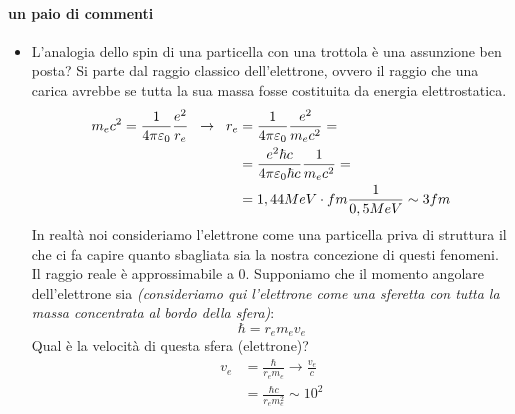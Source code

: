 \paragraph{un paio di commenti}
\begin{itemize}
\item L'analogia dello spin di una particella con una trottola è una assunzione ben posta?
Si parte dal raggio classico dell'elettrone, ovvero il raggio che una carica avrebbe se tutta la sua massa fosse costituita da energia elettrostatica.
\begin{equation}
\begin{split}
m_e c^2=\frac{1}{4\pi\varepsilon_0}\frac{e^2}{r_e}\hspace{0.2cm}\to\hspace{0.2cm}r_e & =\frac{1}{4\pi\varepsilon_0}\frac{e^2}{m_ec^2}=\\
&=\frac{e^2\hbar c}{4\pi \varepsilon_0\hbar c}\frac{1}{m_ec^2}=\\
&=1,44MeV\cdot fm\frac{1}{0,5MeV}\sim 3fm
\end{split}
\end{equation}
In realtà noi consideriamo l'elettrone come una particella priva di struttura il che ci fa capire quanto sbagliata sia la nostra concezione di questi fenomeni. 
Il raggio reale è approssimabile a $0$.
Supponiamo che il momento angolare dell'elettrone sia \emph{(consideriamo qui l'elettrone come una sferetta con tutta la massa concentrata al bordo della sfera)}:
\begin{equation}
\hbar=r_e m_e v_e
\end{equation}
Qual è la velocità di questa sfera (elettrone)?
\begin{equation}
\begin{split}
v_e&=\frac{\hbar}{r_em_e}\to\frac{v_e}{c}\\
&=\frac{\hbar c}{r_em_e^2}\sim 10^2
\end{split}
\end{equation}


\end{itemize}
